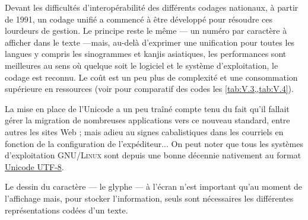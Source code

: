 \vfill\pagebreak

%
Devant les difficultés d'interopérabilité des différents codages nationaux, à partir de 1991, un codage unifié a commencé à être développé pour résoudre ces lourdeurs de gestion. Le principe reste le même --- un numéro par caractère à afficher dans le texte ---mais, au-delà d'exprimer une unification pour toutes les langues y compris les sinogrammes et kanjis asiatiques, les performances sont meilleures au sens où quelque soit le logiciel et le système d'exploitation, le codage est reconnu. Le coût est un peu plus de complexité et une consommation supérieure en ressources (voir pour comparatif des codes les \cref{tab:V.3,,tab:V.4}).

La mise en place de l'Unicode a un peu traîné compte tenu du fait qu'il fallait gérer la migration de nombreuses applications vers ce nouveau standard, entre autres les sites Web ; mais adieu au signes cabalistiques dans les courriels en fonction de la configuration de l'expéditeur... On peut noter que tous les systèmes d'exploitation GNU/\textsc{Linux} sont depuis une bonne décennie nativement au format \href{https://fr.wikipedia.org/wiki/UTF-8}{Unicode UTF-8}.

Le dessin du caractère --- le glyphe --- à l'écran n'est important qu'au moment de l'affichage mais, pour stocker l'information, seuls sont nécessaires les différentes représentations codées d'un texte.


